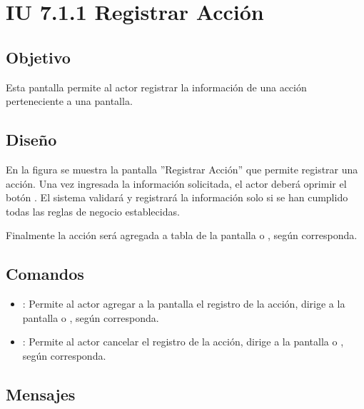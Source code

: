 \section{IU 7.1.1 Registrar Acción}

\subsection{Objetivo}
	Esta pantalla permite al actor registrar la información de una acción perteneciente a una pantalla.
\subsection{Diseño}
	En la figura  se muestra la pantalla ''Registrar Acción'' que permite registrar una acción.
	Una vez ingresada la información solicitada, el actor deberá oprimir el botón  . El sistema validará y registrará la información solo si se han cumplido todas las reglas de negocio establecidas.
	
	Finalmente la acción será agregada a tabla de la pantalla  o , según corresponda.

\subsection{Comandos}
\begin{itemize}
	\item {}: Permite al actor agregar a la pantalla el registro de la acción, dirige a la pantalla  o , según corresponda.
	\item {}: Permite al actor cancelar el registro de la acción, dirige a la pantalla  o , según corresponda.
\end{itemize}

\subsection{Mensajes}


